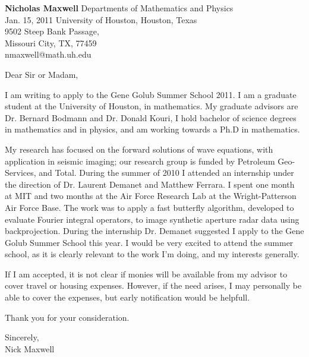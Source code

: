 \documentclass[11pt]{article}
\begin{document}
\vspace{2in}

\begin{flushright}
{\bf Nicholas Maxwell} \hfill Departments of Mathematics and Physics \\
 Jan. 15, 2011 \hfill  University of Houston, Houston, Texas \\
 \hfill  9502 Steep Bank Passage,\\
 \hfill Missouri City, TX, 77459 \\
 \hfill  nmaxwell@math.uh.edu\\
\end{flushright}




\begin{flushleft}
Dear Sir or Madam,\\
\end{flushleft}


I am writing to apply to the Gene Golub Summer School 2011. I am a graduate student at the University of Houston, in mathematics. My graduate advisors are Dr. Bernard Bodmann and Dr. Donald Kouri, I hold bachelor of science degrees in mathematics and in physics, and am working towards a Ph.D in mathematics.

My research has focused on the forward solutions of wave equations, with application in seismic imaging; our research group is funded by Petroleum Geo-Services, and Total. During the summer of 2010 I attended an internship under the direction of Dr. Laurent Demanet and Matthew Ferrara. I spent one month at MIT and two months at the Air Force Research Lab at the Wright-Patterson Air Force Base. The work was to apply a fast butterfly algorithm, developed to evaluate Fourier integral operators, to image synthetic aperture radar data using backprojection. During the internship Dr. Demanet suggested I apply to the Gene Golub Summer School this year. I would be very excited to attend the summer school, as it is clearly relevant to the work I'm doing, and my interests generally.

If I am accepted, it is not clear if monies will be available from my advisor to cover travel or housing expenses. However, if the need arises, I may personally be able to cover the expenses, but early notification would be helpfull.

Thank you for your consideration.

\begin{flushleft}
Sincerely, \\
Nick Maxwell
\end{flushleft}
\end{document}
